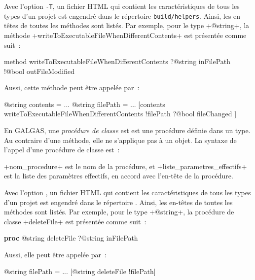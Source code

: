 Avec l'option \texttt{-T}, un fichier HTML qui contient les caractéristiques de tous les types d'un projet est engendré dans le répertoire \texttt{build/helpers}. Ainsi, les en-têtes de toutes les méthodes sont listés. Par exemple, pour le type \ggs+@string+, la méthode \ggs+writeToExecutableFileWhenDifferentContents+ est présentée comme suit~:

\begin{galgas}
method writeToExecutableFileWhenDifferentContents
  ?@string inFilePath
  !@bool outFileModified
\end{galgas}


Aussi, cette méthode peut être appelée par~:
\begin{galgas}
@string contents = ...
@string filePath = ...
[contents writeToExecutableFileWhenDifferentContents
  !filePath
  ?@bool fileChanged
]
\end{galgas}
















En GALGAS, une \emph{procédure de classe} est est une procédure définie dans un type. Au contraire d'une méthode, elle ne s'applique pas à un objet. La syntaxe de l'appel d'une procédure de classe est~:
\begin{galgas}
\end{galgas}

\ggs+nom_procedure+ est le nom de la procédure, et \ggs+liste_parametres_effectifs+ est la liste des paramètres effectifs, en accord avec l'en-tête de la procédure.

Avec l'option , un fichier HTML qui contient les caractéristiques de tous les types d'un projet est engendré dans le répertoire . Ainsi, les en-têtes de toutes les méthodes sont listés. Par exemple, pour le type \ggs+@string+, la procédure de classe \ggs+deleteFile+ est présentée comme suit~:

{\noindent\ttfamily
\textbf{proc} @string deleteFile ?@string inFilePath\\
}

Aussi, elle peut être appelée par~:
\begin{galgas}
@string filePath = ...
[@string deleteFile !filePath]
\end{galgas}









